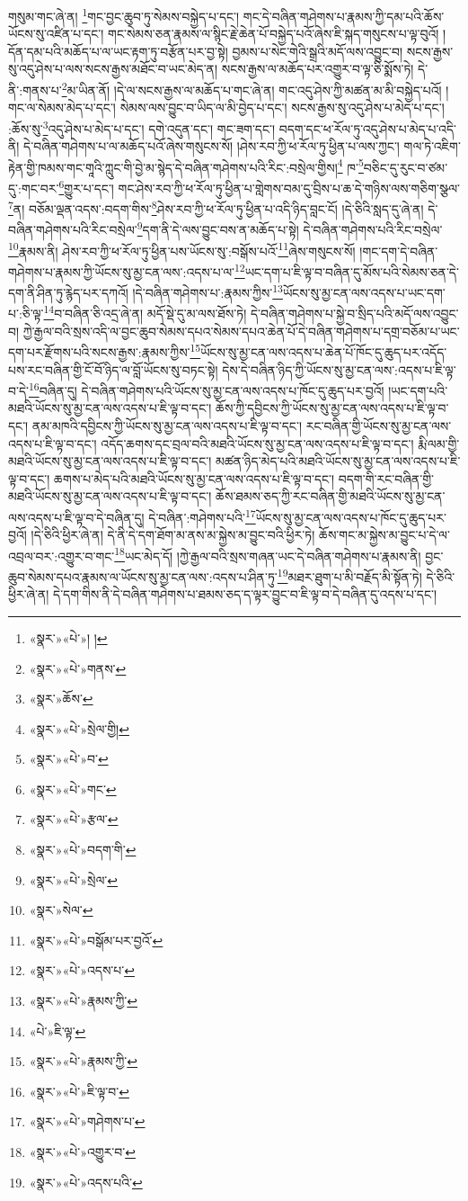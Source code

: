 གསུམ་གང་ཞེ་ན། \footnote{«སྣར་»«པེ་»། ། }གང་བྱང་ཆུབ་ཏུ་སེམས་བསྐྱེད་པ་དང་། གང་དེ་བཞིན་གཤེགས་པ་རྣམས་ཀྱི་དམ་པའི་ཆོས་ཡོངས་སུ་འཛིན་པ་དང་། གང་སེམས་ཅན་རྣམས་ལ་སྙིང་རྗེ་ཆེན་པོ་བསྐྱེད་པའོ་ཞེས་ཇི་སྐད་གསུངས་པ་ལྟ་བུའོ། །དོན་དམ་པའི་མཆོད་པ་ལ་ཡང་རྟག་ཏུ་བརྩོན་པར་བྱ་སྟེ། བྱམས་པ་སེང་གེའི་སྒྲའི་མདོ་ལས་འབྱུང་བ། སངས་རྒྱས་སུ་འདུ་ཤེས་པ་ལས་སངས་རྒྱས་མཐོང་བ་ཡང་མེད་ན། སངས་རྒྱས་ལ་མཆོད་པར་འགྱུར་བ་ལྟ་ཅི་སྨོས་ཏེ། དེ་ནི་:གནས་པ་\footnote{«སྣར་»«པེ་»གནས་}མ་ཡིན་ནོ། །དེ་ལ་སངས་རྒྱས་ལ་མཆོད་པ་གང་ཞེ་ན། གང་འདུ་ཤེས་ཀྱི་མཚན་མ་མི་བསྐྱེད་པའོ། །གང་ལ་སེམས་མེད་པ་དང་། སེམས་ལས་བྱུང་བ་ཡིད་ལ་མི་བྱེད་པ་དང་། སངས་རྒྱས་སུ་འདུ་ཤེས་པ་མེད་པ་དང་། :ཆོས་སུ་\footnote{«སྣར་»ཆོས་}འདུ་ཤེས་པ་མེད་པ་དང་། དགེ་འདུན་དང་། གང་ཟག་དང་། བདག་དང་ཕ་རོལ་ཏུ་འདུ་ཤེས་པ་མེད་པ་འདི་ནི། དེ་བཞིན་གཤེགས་པ་ལ་མཆོད་པའོ་ཞེས་གསུངས་སོ། །ཤེས་རབ་ཀྱི་ཕ་རོལ་ཏུ་ཕྱིན་པ་ལས་ཀྱང་། གལ་ཏེ་འཇིག་རྟེན་གྱི་ཁམས་གང་གཱའི་ཀླུང་གི་བྱེ་མ་སྙེད་དེ་བཞིན་གཤེགས་པའི་རིང་:བསྲེལ་གྱིས།\footnote{«སྣར་»«པེ་»སྲེལ་གྱི།} ཁ་\footnote{«སྣར་»«པེ་»བ་}བཅིང་དུ་རུང་བ་ཙམ་དུ་:གང་བར་\footnote{«སྣར་»«པེ་»གང་}གྱུར་པ་དང་། གང་ཤེས་རབ་ཀྱི་ཕ་རོལ་ཏུ་ཕྱིན་པ་གླེགས་བམ་དུ་བྲིས་པ་ཆ་དེ་གཉིས་ལས་གཅིག་སྩལ་\footnote{«སྣར་»«པེ་»རྩལ་}ན། བཅོམ་ལྡན་འདས་:བདག་གིས་\footnote{«སྣར་»«པེ་»བདག་གི་}ཤེས་རབ་ཀྱི་ཕ་རོལ་ཏུ་ཕྱིན་པ་འདི་ཉིད་བླང་ངོ། །དེ་ཅིའི་སླད་དུ་ཞེ་ན། དེ་བཞིན་གཤེགས་པའི་རིང་བསྲེལ་\footnote{«སྣར་»«པེ་»སྲེལ་}དག་ནི་དེ་ལས་བྱུང་བས་ན་མཆོད་པ་སྟེ། དེ་བཞིན་གཤེགས་པའི་རིང་བསྲེལ་\footnote{«སྣར་»སེལ་}རྣམས་ནི། ཤེས་རབ་ཀྱི་ཕ་རོལ་ཏུ་ཕྱིན་པས་ཡོངས་སུ་:བསྒོས་པའོ་\footnote{«སྣར་»«པེ་»བསྒོམ་པར་བྱའོ་}ཞེས་གསུངས་སོ། །གང་དག་དེ་བཞིན་གཤེགས་པ་རྣམས་ཀྱི་ཡོངས་སུ་མྱ་ངན་ལས་:འདས་པ་ལ་\footnote{«སྣར་»«པེ་»འདས་པ་}ཡང་དག་པ་ཇི་ལྟ་བ་བཞིན་དུ་མོས་པའི་སེམས་ཅན་དེ་དག་ནི་ཤིན་ཏུ་རྙེད་པར་དཀའོ། །དེ་བཞིན་གཤེགས་པ་:རྣམས་ཀྱིས་\footnote{«སྣར་»«པེ་»རྣམས་ཀྱི་}ཡོངས་སུ་མྱ་ངན་ལས་འདས་པ་ཡང་དག་པ་:ཅི་ལྟ་\footnote{«པེ་»ཇི་ལྟ་}བ་བཞིན་ཅི་འདྲ་ཞེ་ན། མདོ་སྡེ་དུ་མ་ལས་ཐོས་ཏེ། དེ་བཞིན་གཤེགས་པ་སྐྱེ་བ་སྲིད་པའི་མདོ་ལས་འབྱུང་བ། ཀྱེ་རྒྱལ་བའི་སྲས་འདི་ལ་བྱང་ཆུབ་སེམས་དཔའ་སེམས་དཔའ་ཆེན་པོ་དེ་བཞིན་གཤེགས་པ་དགྲ་བཅོམ་པ་ཡང་དག་པར་རྫོགས་པའི་སངས་རྒྱས་:རྣམས་ཀྱིས་\footnote{«སྣར་»«པེ་»རྣམས་ཀྱི་}ཡོངས་སུ་མྱ་ངན་ལས་འདས་པ་ཆེན་པོ་ཁོང་དུ་ཆུད་པར་འདོད་པས་རང་བཞིན་གྱི་ངོ་བོ་ཉིད་ལ་བློ་ཡོངས་སུ་བཏང་སྟེ། དེས་དེ་བཞིན་ཉིད་ཀྱི་ཡོངས་སུ་མྱ་ངན་ལས་:འདས་པ་ཇི་ལྟ་བ་དེ་\footnote{«སྣར་»«པེ་»ཇི་ལྟ་བ་}བཞིན་དུ། དེ་བཞིན་གཤེགས་པའི་ཡོངས་སུ་མྱ་ངན་ལས་འདས་པ་ཁོང་དུ་ཆུད་པར་བྱའོ། །ཡང་དག་པའི་མཐའི་ཡོངས་སུ་མྱ་ངན་ལས་འདས་པ་ཇི་ལྟ་བ་དང་། ཆོས་ཀྱི་དབྱིངས་ཀྱི་ཡོངས་སུ་མྱ་ངན་ལས་འདས་པ་ཇི་ལྟ་བ་དང་། ནམ་མཁའི་དབྱིངས་ཀྱི་ཡོངས་སུ་མྱ་ངན་ལས་འདས་པ་ཇི་ལྟ་བ་དང་། རང་བཞིན་གྱི་ཡོངས་སུ་མྱ་ངན་ལས་འདས་པ་ཇི་ལྟ་བ་དང་། འདོད་ཆགས་དང་བྲལ་བའི་མཐའི་ཡོངས་སུ་མྱ་ངན་ལས་འདས་པ་ཇི་ལྟ་བ་དང་། རྨི་ལམ་གྱི་མཐའི་ཡོངས་སུ་མྱ་ངན་ལས་འདས་པ་ཇི་ལྟ་བ་དང་། མཚན་ཉིད་མེད་པའི་མཐའི་ཡོངས་སུ་མྱ་ངན་ལས་འདས་པ་ཇི་ལྟ་བ་དང་། ཆགས་པ་མེད་པའི་མཐའི་ཡོངས་སུ་མྱ་ངན་ལས་འདས་པ་ཇི་ལྟ་བ་དང་། བདག་གི་རང་བཞིན་གྱི་མཐའི་ཡོངས་སུ་མྱ་ངན་ལས་འདས་པ་ཇི་ལྟ་བ་དང་། ཆོས་ཐམས་ཅད་ཀྱི་རང་བཞིན་གྱི་མཐའི་ཡོངས་སུ་མྱ་ངན་ལས་འདས་པ་ཇི་ལྟ་བ་དེ་བཞིན་དུ། དེ་བཞིན་:གཤེགས་པའི་\footnote{«སྣར་»«པེ་»གཤེགས་པ་}ཡོངས་སུ་མྱ་ངན་ལས་འདས་པ་ཁོང་དུ་ཆུད་པར་བྱའོ། །དེ་ཅིའི་ཕྱིར་ཞེ་ན། དེ་ནི་དེ་དག་ཐོག་མ་ནས་མ་སྐྱེས་མ་བྱུང་བའི་ཕྱིར་ཏེ། ཆོས་གང་མ་སྐྱེས་མ་བྱུང་པ་དེ་ལ་འབྲལ་བར་:འགྱུར་བ་གང་\footnote{«སྣར་»«པེ་»འགྱུར་བ་}ཡང་མེད་དོ། །ཀྱེ་རྒྱལ་བའི་སྲས་གཞན་ཡང་དེ་བཞིན་གཤེགས་པ་རྣམས་ནི། བྱང་ཆུབ་སེམས་དཔའ་རྣམས་ལ་ཡོངས་སུ་མྱ་ངན་ལས་:འདས་པ་ཤིན་ཏུ་\footnote{«སྣར་»«པེ་»འདས་པའི་}མཐར་ཐུག་པ་མི་བརྗོད་མི་སྟོན་ཏེ། དེ་ཅིའི་ཕྱིར་ཞེ་ན། དེ་དག་གིས་ནི་དེ་བཞིན་གཤེགས་པ་ཐམས་ཅད་ད་ལྟར་བྱུང་བ་ཇི་ལྟ་བ་དེ་བཞིན་དུ་འདས་པ་དང་། 